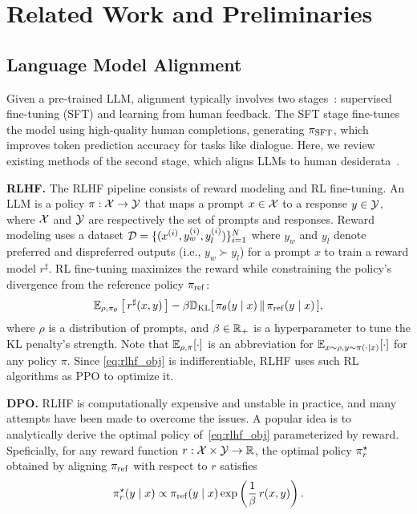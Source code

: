 \section{Related Work and Preliminaries}
\label{sec:preliminary}

\subsection{Language Model Alignment}
Given a pre-trained LLM, alignment typically involves two stages~\citep{bai2022training, ouyang2022training, ziegler2019fine}: supervised fine-tuning (SFT) and learning from human feedback.
The SFT stage fine-tunes the model using high-quality human completions, generating $\pi_\text{SFT}$, which improves token prediction accuracy for tasks like dialogue. Here, we review existing methods of the second stage, which aligns LLMs to human desiderata~\citep{christiano2017deep}.

\textbf{RLHF.\space}
The RLHF pipeline consists of reward modeling and RL fine-tuning. An LLM is a policy $\pi: \mathcal{X} \rightarrow \mathcal{Y}$ that maps a prompt $x \in \mathcal{X}$ to a response $y \in \mathcal{Y}$, where $\mathcal{X}$ and $\mathcal{Y}$ are respectively the set of prompts and responses. Reward modeling uses a dataset $\mathcal{D} = \{(x^{(i)}, y_w^{(i)}, y_l^{(i)})\}_{i=1}^N$ where $y_w$ and $y_l$ denote preferred and dispreferred outputs (i.e., $y_w \succ y_l$) for a prompt $x$ to train a reward model $r^\sharp$.
%
RL fine-tuning maximizes the reward while constraining the policy's divergence from the reference policy $\pi_\mathrm{ref}$:
%
\begin{equation}
    \mathbb{E}_{\rho, \pi_\theta} \left[\,r^\sharp (x,y)\,\right] - \beta \mathbb{D}_{\mathrm{KL}}[\,\pi_\theta(y \mid x) \, \| \, \pi_\mathrm{ref}(y \mid x)\,],
    \label{eq:rlhf_obj}
\end{equation}
%
where $\rho$ is a distribution of prompts, and $\beta \in \mathbb{R}_+$ is a hyperparameter to tune the KL penalty's strength. 
Note that $\mathbb{E}_{\rho, \pi}[\cdot]$ is an abbreviation for $\mathbb{E}_{x \sim \rho, y \sim \pi(\cdot \mid x)}[\cdot]$ for any policy $\pi$.
Since \eqref{eq:rlhf_obj} is indifferentiable, RLHF uses such RL algorithms as PPO \citep{schulman2017proximal} to optimize it.

\textbf{DPO.\space}
%
RLHF is computationally expensive and unstable in practice, and many attempts have been made to overcome the issues.
A popular idea is to analytically derive the optimal policy of~\eqref{eq:rlhf_obj} parameterized by reward.
Speficially, for any reward function $r: \mathcal{X} \times \mathcal{Y} \rightarrow \mathbb{R}$, the optimal policy $\pi^\star_{r}$ obtained by aligning $\pi_\mathrm{ref}$ with respect to $r$ satisfies
%
\begin{equation}
    \label{eq:op_policy}
    \pi^\star_{r}(y \mid x) \propto \pi_\mathrm{ref}(y \mid x) \exp\left(\frac{1}{\beta} \, r (x,y) \right).
\end{equation}


